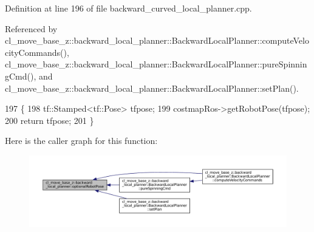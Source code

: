 Definition at line 196 of file backward\+\_\+curved\+\_\+local\+\_\+planner.\+cpp.



Referenced by cl\+\_\+move\+\_\+base\+\_\+z\+::backward\+\_\+local\+\_\+planner\+::\+Backward\+Local\+Planner\+::compute\+Velocity\+Commands(), cl\+\_\+move\+\_\+base\+\_\+z\+::backward\+\_\+local\+\_\+planner\+::\+Backward\+Local\+Planner\+::pure\+Spinning\+Cmd(), and cl\+\_\+move\+\_\+base\+\_\+z\+::backward\+\_\+local\+\_\+planner\+::\+Backward\+Local\+Planner\+::set\+Plan().


\begin{DoxyCode}
197 \{
198     tf::Stamped<tf::Pose> tfpose;
199     costmapRos->getRobotPose(tfpose);
200     \textcolor{keywordflow}{return} tfpose;
201 \}
\end{DoxyCode}
Here is the caller graph for this function\+:
\nopagebreak
\begin{figure}[H]
\begin{center}
\leavevmode
\includegraphics[width=350pt]{namespacecl__move__base__z_1_1backward__local__planner_afd5bb2a0d144f7b89f4215fbcb1fbe69_icgraph}
\end{center}
\end{figure}
